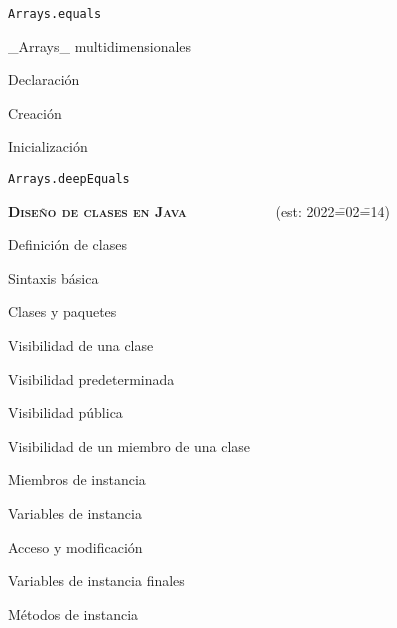 \begin{longenum}
\begin{longenum}
\begin{longenum}
\begin{longenum}
                \item \texttt{Arrays.equals}
            \end{longenum}
            \item \_Arrays\_ multidimensionales
            \begin{longenum}
                \item Declaración
                \item Creación
                \item Inicialización
                \item \texttt{Arrays.deepEquals}
            \end{longenum}
        \end{longenum}
    \end{longenum}
    \item \textbf{\textsc{Diseño de clases en Java}} \ \ \ \ \ \ \ \ \ \ \ \ (est: 2022\==02\==14)
    \begin{longenum}
        \item Definición de clases
        \begin{longenum}
            \item Sintaxis básica
            \item Clases y paquetes
            \item Visibilidad de una clase
            \begin{longenum}
                \item Visibilidad predeterminada
                \item Visibilidad pública
            \end{longenum}
            \item Visibilidad de un miembro de una clase
        \end{longenum}
        \item Miembros de instancia
        \begin{longenum}
            \item Variables de instancia
            \begin{longenum}
                \item Acceso y modificación
                \item Variables de instancia finales
            \end{longenum}
            \item Métodos de instancia
            \begin{longenum}

\end{longenum}
\end{longenum}
\end{longenum}
\end{longenum}
